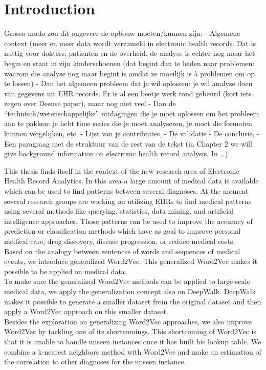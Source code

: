 \chapter{Introduction}
\label{cha:introduction}

Grosso modo zou dit ongeveer de opbouw moeten/kunnen zijn:
-          Algemene context (meer en meer data wordt verzameld in electronic health records. Dat is nuttig voor dokters, patienten en de overheid, de analyse is echter nog maar het begin en staat in zijn kinderschoenen (dat begint dan te leiden naar problemen: waarom die analyse nog maar begint is omdat ze moeilijk is à problemen om op te lossen)
-          Dan het algemeen probleem dat je wil oplossen: je wil analyse doen van gegevens uit EHR records. Er is al een beetje werk rond gebeurd (kort iets zegen over Deense paper), maar nog niet veel
-          Dan de “technisch/wetenschappelijke” uitdagingen die je moet oplossen om het probleem aan te pakken: je hebt time series die je moet analyseren, je moet die formaten kunnen vergelijken, etc.
-          Lijst van je contributies,
-          De validatie
-          De conclusie,
-          Een paragraag met de struktuur van de rest van de tekst (in Chapter 2 we will give background information on electronic health record analysis. In …)

This thesis finds itself in the context of the new research area of Electronic Health Record Analytics. In this area a large amount of medical data is available which can be used to find patterns between several diagnoses. At the moment several research groups are working on utilizing EHRs to find medical patterns using several methods like querying, statistics, data mining, and artificial intelligence approaches. Those patterns can be used to improve the accuracy of prediction or classification methods which have as goal to improve personal medical care, drug discovery, disease progression, or reduce medical costs. \\

Based on the analogy between sentences of words and sequences of medical events, we introduce generalized Word2Vec. This generalized Word2Vec makes it possible to be applied on medical data. \\
To make sure the generalized Word2Vec methods can be applied to large-scale medical data, we apply the generalization concept also on DeepWalk. DeepWalk makes it possible to generate a smaller dataset from the original dataset and then apply a Word2Vec approach on this smaller dataset. \\
Besides the exploration on generalizing Word2Vec approaches, we also improve Word2Vec by tackling one of its shortcomings. This shortcoming of Word2Vec is that it is unable to handle unseen instances once it has built his lookup table. We combine a k-nearest neighbors method with Word2Vec and make an estimation of the correlation to other diagnoses for the unseen instance. \\

